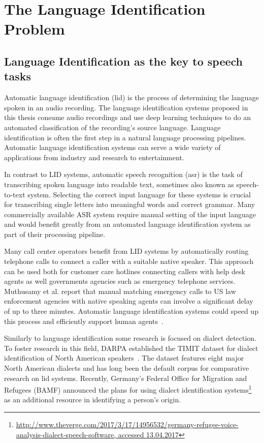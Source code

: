 \section{The Language Identification Problem}
\label{sec:lid}

\subsection{Language Identification as the key to speech tasks}

Automatic language identification (\ac{lid}) is the process of determining the language spoken in an audio recording. The language identification systems proposed in this thesis consume audio recordings and use deep learning techniques to do an automated classification of the recording's source language.
Language identification is often the first step in a natural language processing pipelines. Automatic language identification systems can serve a wide variety of applications from industry and research to entertainment. 

In contrast to LID systems, automatic speech recognition (\ac{asr}) is the task of transcribing spoken language into readable text, sometimes also known as speech-to-text system. Selecting the correct input language for these systems is crucial for transcribing single letters into meaningful words and correct grammar. Many commercially available ASR system require manual setting of the input language and would benefit greatly from an automated language identification system as part of their processing pipeline.

Many call center operators benefit from LID systems by automatically routing telephone calls to connect a caller with a suitable native speaker. This approach can be used both for customer care hotlines connecting callers with help desk agents as well governments agencies such as emergency telephone services. Muthusamy et al. report that manual matching emergency calls to US law enforcement agencies with native speaking agents can involve a significant delay of up to three minutes. Automatic language identification systems could speed up this process and efficiently support human agents~\cite{muthusamy1994reviewing}.

Similarly to language identification some research is focused on dialect detection. To foster research in this field, DARPA established the TIMIT dataset for dialect identification of North American speakers~\cite{garofolo1993darpa}. The dataset features eight major North American dialects and has long been the default corpus for comparative research on lid systems.
Recently, Germany's Federal Office for Migration and Refugees (BAMF) announced the plans for using dialect identification systems\footnote{\url{http://www.theverge.com/2017/3/17/14956532/germany-refugee-voice-analysis-dialect-speech-software, accessed 13.04.2017}} as an additional resource in identifying a person's origin.

